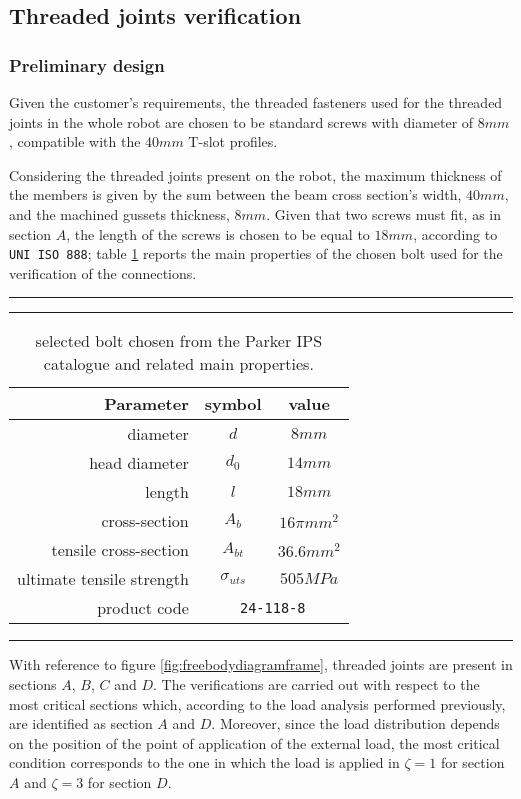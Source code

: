 \subsection{Threaded joints verification}
\subsubsection*{Preliminary design}
Given the customer's requirements, the threaded fasteners used for the threaded joints in the whole robot are chosen to be standard screws with diameter of $8mm$, compatible with the $40mm$ T-slot profiles.

Considering the threaded joints present on the robot, the maximum thickness of the members is given by the sum between the beam cross section's width, $40 mm$, and the machined gussets thickness, $8 mm$. Given that two screws must fit, as in section $A$, the length of the screws is chosen to be equal to $18 mm$, according to \texttt{UNI ISO 888}; table \ref{tab:boltchoise} reports the main properties of the chosen bolt used for the verification of the connections.

\begin{table}[bth]
	\rule{\linewidth}{2pt}
	\caption{selected bolt chosen from the Parker IPS catalogue \cite{parker-ds} and related main properties.}
	\label{tab:boltchoise}
	\rule{\linewidth}{1pt} 
	\begin{center}
	\begin{tabular}{r c c}
		Parameter & symbol & value \\ \hline
		diameter & $d$ & $8mm$ \\
		head diameter & $d_0$ & $14mm$ \\
		length & $l$ & $18mm$ \\
		cross-section & $A_b$ & $16\pi mm^2$ \\
		tensile cross-section & $A_{bt}$ & $36.6mm^2$ \\
		ultimate tensile strength & $\sigma_{uts}$ & $505MPa$ \\
		product code & \multicolumn{2}{c}{\texttt{24-118-8}}
	\end{tabular}
	\end{center}
	\rule{\linewidth}{2pt}
\end{table}

With reference to figure \ref{fig:freebodydiagramframe}, threaded joints are present in sections $A$, $B$, $C$ and $D$. The verifications are carried out with respect to the most critical sections which, according to the load analysis performed previously, are identified as section $A$ and $D$. Moreover, since the load distribution depends on the position of the point of application of the external load, the most critical condition corresponds to the one in which the load is applied in $\zeta = 1$ for section $A$ and $\zeta = 3$ for section $D$.\\
